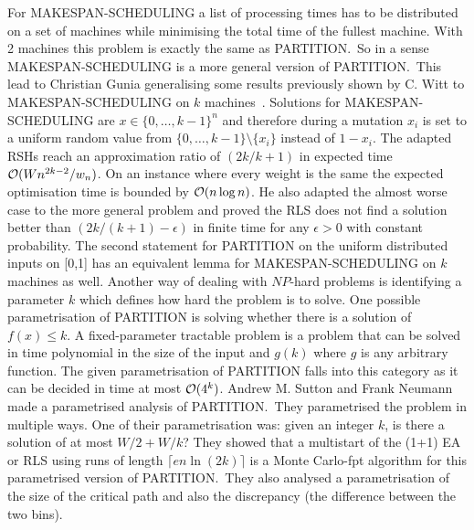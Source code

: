 For MAKESPAN-SCHEDULING a list of processing times has to be distributed on a set of machines while minimising the total time of the fullest machine.
With 2 machines this problem is exactly the same as PARTITION.\
So in a sense MAKESPAN-SCHEDULING is a more general version of PARTITION.\
This lead to Christian Gunia generalising some results previously shown by C. Witt to MAKESPAN-SCHEDULING on $k$ machines~\cite{gunia2005analysis}.
Solutions for MAKESPAN-SCHEDULING are \(x\in{\{0,\dots,k-1\}}^n\) and therefore during a mutation $x_i$ is set to a uniform random value from $\{0,\dots,k-1\}\text{\textbackslash}\{x_i\}$ instead of $1-x_i$.
The adapted RSHs reach an approximation ratio of $(2k/k+1)$ in expected time $\mathcal{O}(Wn^{2k-2}/w_n)$.
On an instance where every weight is the same the expected optimisation time is bounded by $\mathcal{O}(n\log{n})$.
He also adapted the almost worse case to the more general problem and proved the RLS does not find a solution better than \((2k/(k+1)-\epsilon)\) in finite time for any $\epsilon>0$ with constant probability.
The second statement for PARTITION on the uniform distributed inputs on [0,1] has an equivalent lemma for MAKESPAN-SCHEDULING on $k$ machines as well.\newline
Another way of dealing with $NP$-hard problems is identifying a parameter $k$ which defines how hard the problem is to solve.
One possible parametrisation of PARTITION is solving whether there is a solution of $f(x)\le k$.
A fixed-parameter tractable problem is a problem that can be solved in time polynomial in the size of the input and $g(k)$ where $g$ is any arbitrary function.
The given parametrisation of PARTITION falls into this category as it can be decided in time at most $\mathcal{O}(4^k)$\cite{fernau2005parameterized}.
Andrew M. Sutton and Frank Neumann made a parametrised analysis of PARTITION\cite{sutton2012parameterized}.\
They parametrised the problem in multiple ways.
One of their parametrisation was: given an integer $k$, is there a solution of at most $W/2+W/k$?
They showed that a multistart of the (1+1) EA or RLS using runs of length \(\lceil en\ln(2k)\rceil\) is a Monte Carlo-fpt algorithm for this parametrised version of PARTITION.\
They also analysed a parametrisation of the size of the critical path and also the discrepancy (the difference between the two bins).

